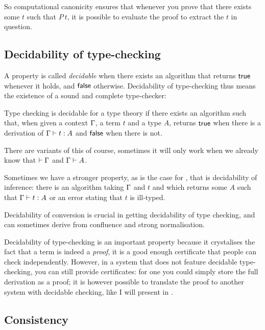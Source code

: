 So computational canonicity ensures that whenever you prove that there exists
some \(t\) such that \(P\ t\), it is possible to evaluate the proof to extract
the \(t\) in question.

\subsection{Decidability of type-checking}

A property is called \emph{decidable} when there exists an algorithm that
returns \(\mathsf{true}\) whenever it holds, and \(\mathsf{false}\) otherwise.
Decidability of type-checking thus means the existence of a sound and complete
type-checker:

\begin{definition}
  Type checking is decidable for a type theory if there exists an algorithm
  such that, when given a context \(\Gamma\), a term \(t\) and a type \(A\),
  returns \(\mathsf{true}\) when there is a derivation of \(\Gamma \vdash t : A\)
  and \(\mathsf{false}\) when there is not.
\end{definition}

There are variants of this of course, sometimes it will only work when we
already know that \(\vdash \Gamma\) and \(\Gamma \vdash A\).

Sometimes we have a stronger property, as is the case for \Coq, that is
decidability of inference:
there is an algorithm taking \(\Gamma\) and \(t\) and which returns some \(A\)
such that \(\Gamma \vdash t : A\) or an error stating that \(t\) is ill-typed.

Decidability of conversion is crucial in getting decidability of type
checking, and can sometimes derive from confluence and strong normalisation.

Decidability of type-checking is an important property because it crystalises
the fact that a term is indeed a \emph{proof}, it is a good enough certificate
that people can check independently.
However, in a system that does not feature decidable type-checking, you can still
provide certificates: for one you could simply store the full derivation as a
proof; it is however possible to translate the proof to another system with
decidable checking, like I will present in .

\subsection{Consistency}

